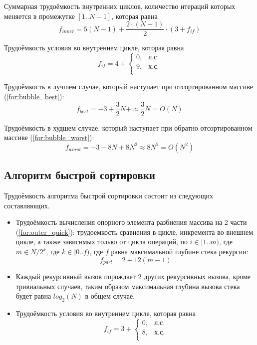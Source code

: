 Суммарная трудоёмкость внутренних циклов, количество итераций которых меняется в промежутке $[1..N-1]$, которая равна
\begin{equation}
	\label{for:bubble_inner}
	f_{inner} = 5(N - 1) + \frac{2 \cdot (N - 1)}{2} \cdot (3 + f_{if})
\end{equation}

Трудоёмкость условия во внутреннем цикле, которая равна
\begin{equation}
	\label{for:bubble_if}
	f_{if} = 4 + \begin{cases}
		0, & \text{л.с.}\\
		9, & \text{х.с.}\\
	\end{cases}
\end{equation}

Трудоёмкость в лучшем случае, который наступает при отсортированном массиве (\ref{for:bubble_best}):
\begin{equation}
	\label{for:bubble_best}
	f_{best} = -3 + \frac{3}{2} N + \approx \frac{3}{2} N = O(N)
\end{equation}

Трудоёмкость в худшем случае, который наступает при обратно отсортированном массиве (\ref{for:bubble_worst}):
\begin{equation}
	\label{for:bubble_worst}
	f_{worst} = -3 - 8N + 8N^2 \approx 8N^2 = O(N^2)
\end{equation}



\subsection{Алгоритм быстрой сортировки}


Трудоёмкость алгоритма быстрой сортировки состоит из следующих составляющих.
\begin{itemize}
	\item Трудоёмкость вычисления опорного элемента разбиения массива на 2 части (\ref{for:outer_quick}): трудоемкость сравнения в цикле, инкремента во внешнем цикле, а также зависимых только от цикла операций, по $i \in [1..m)$, где $m \in N/2^k$, где $k \in [0..f)$, где $f$ равна максимальной глубине стека рекурсии:
	\begin{equation}
		\label{for:outer_quick}
		f_{part} = 2 + 12(m - 1)
	\end{equation}
	\item Каждый рекурсивный вызов порождает 2 других рекурсивных вызова, кроме тривиальных случаев, таким образом максимальная глубина вызова стека будет равна $log_2(N)$ в общем случае.
	\item Трудоёмкость условия во внутреннем цикле, которая равна
	\begin{equation}
		\label{for:quick_if}
		f_{if} = 3 + \begin{cases}
			0, & \text{л.с.}\\
			8, & \text{х.с.}\\
		\end{cases}
	\end{equation}
\end{itemize}


